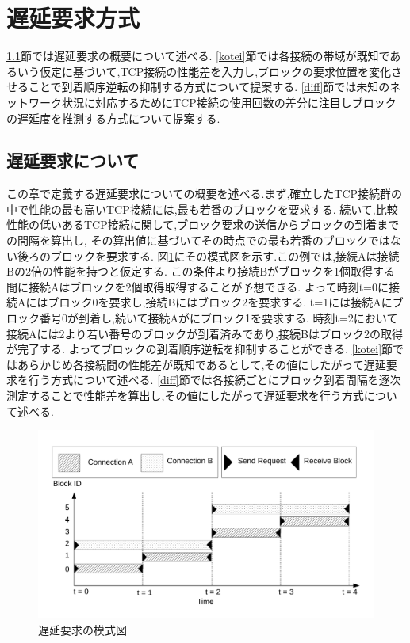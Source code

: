 \documentclass[a4j,12pt]{gradthesis_utf8}
\begin{document}
\section{遅延要求方式}
\label{chienyokyuhoshiki}
\ref{chienyokyu}節では遅延要求の概要について述べる.
\ref{kotei}節では各接続の帯域が既知であるいう仮定に基づいて,TCP接続の性能差を入力し,ブロックの要求位置を変化させることで到着順序逆転の抑制する方式について提案する.
\ref{diff}節では未知のネットワーク状況に対応するためにTCP接続の使用回数の差分に注目しブロックの遅延度を推測する方式について提案する.

\subsection{遅延要求について}
\label{chienyokyu}
この章で定義する遅延要求についての概要を述べる.まず,確立したTCP接続群の中で性能の最も高いTCP接続には,最も若番のブロックを要求する.
続いて,比較性能の低いあるTCP接続に関して,ブロック要求の送信からブロックの到着までの間隔を算出し,
その算出値に基づいてその時点での最も若番のブロックではない後ろのブロックを要求する.
図\ref{delay}にその模式図を示す.この例では,接続Aは接続Bの2倍の性能を持つと仮定する.
この条件より接続Bがブロックを1個取得する間に接続Aはブロックを2個取得取得することが予想できる.
よって時刻t=0に接続Aにはブロック0を要求し,接続Bにはブロック2を要求する.
t=1には接続Aにブロック番号0が到着し,続いて接続Aがにブロック1を要求する.
時刻t=2において接続Aには2より若い番号のブロックが到着済みであり,接続Bはブロック2の取得が完了する.
よってブロックの到着順序逆転を抑制することができる.
\ref{kotei}節ではあらかじめ各接続間の性能差が既知であるとして,その値にしたがって遅延要求を行う方式について述べる.
\ref{diff}節では各接続ごとにブロック到着間隔を逐次測定することで性能差を算出し,その値にしたがって遅延要求を行う方式について述べる.

 \begin{figure}[h]
    \centering
    \includegraphics[width=16.25cm]{delay.pdf}
    \caption{遅延要求の模式図}
    \label{delay}
\end{figure}
\end{document}
